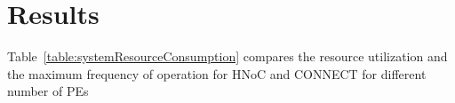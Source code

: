 \section{Results}
\label{sec:result}

Table~\ref{table:systemResourceConsumption} compares the resource utilization and the maximum frequency of operation for HNoC and CONNECT for different number of PEs
